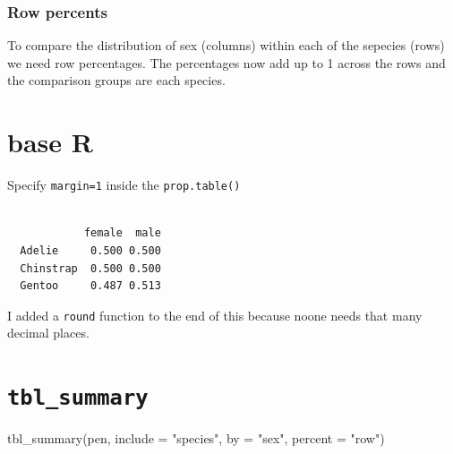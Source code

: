\documentclass[
  letterpaper,
  DIV=11,
  numbers=noendperiod,
  oneside]{scrreprt}
\newenvironment{Shaded}{\begin{snugshade}}{\end{snugshade}}
\newcommand{\AttributeTok}[1]{\textcolor[rgb]{0.40,0.45,0.13}{#1}}
\newcommand{\DecValTok}[1]{\textcolor[rgb]{0.68,0.00,0.00}{#1}}
\newcommand{\FunctionTok}[1]{\textcolor[rgb]{0.28,0.35,0.67}{#1}}
\newcommand{\NormalTok}[1]{\textcolor[rgb]{0.00,0.23,0.31}{#1}}
\newcommand{\SpecialCharTok}[1]{\textcolor[rgb]{0.37,0.37,0.37}{#1}}
\newcommand{\StringTok}[1]{\textcolor[rgb]{0.13,0.47,0.30}{#1}}
\begin{document}
\subsubsection{Row percents}\label{sec-row-pct-table}

To compare the distribution of sex (columns) within each of the sepecies
(rows) we need row percentages. The percentages now add up to 1 across
the rows and the comparison groups are each species.

\section{base R}

Specify \texttt{margin=1} inside the \texttt{prop.table()}

\begin{Shaded}
\end{Shaded}

\begin{verbatim}
           
            female  male
  Adelie     0.500 0.500
  Chinstrap  0.500 0.500
  Gentoo     0.487 0.513
\end{verbatim}

I added a \texttt{round} function to the end of this because noone needs
that many decimal places.

\section{\texorpdfstring{\texttt{tbl\_summary}}{tbl\_summary}}

\begin{Shaded}
\begin{Highlighting}[]
\FunctionTok{tbl\_summary}\NormalTok{(pen, }\AttributeTok{include =} \StringTok{"species"}\NormalTok{, }\AttributeTok{by =} \StringTok{"sex"}\NormalTok{, }\AttributeTok{percent =} \StringTok{"row"}\NormalTok{)}
\end{Highlighting}
\end{Shaded}
\end{document}

